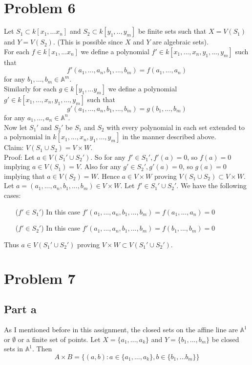 \documentclass[12pt]{article}
\begin{document}
\section*{Problem 6}
Let $S_1 \subset k[x_1,...x_n]$ and $S_2 \subset k[y_1,..,y_m]$ be finite sets such that $X=V(S_1)$ and $Y=V(S_2)$. (This is possible since $X$ and $Y$ are algebraic sets). \\
For each $f \in k[x_1,...x_n]$ we define a polynomial
$f' \in k[x_1,...,x_n,y_1,...,y_m]$ such that
$$f'(a_1,...,a_n,b_1,...,b_m)=f(a_1,...,a_n)$$ for any 
$b_1,...,b_m \in \mathbb{A}^m$. \\
Similarly 
for each $g \in k[y_1,...y_m]$ we define a polynomial
$g' \in k[x_1,...,x_n,y_1,...,y_m]$ such that
$$g'(a_1,...,a_n,b_1,...,b_m)=g(b_1,...,b_m)$$ for any 
$a_1,...,a_n \in \mathbb{A}^n$. \\
Now let $S_1'$ and $S_2'$ be $S_1$ and $S_2$ with every polynomial in each set extended to a polynomial in $k[x_1,...,x_n,y_1,...,y_m]$ in the manner described above. \\
Claim: $V(S_1 \cup S_2)=V \times W$. \\
Proof: Let $a \in V(S_1' \cup S_2')$. So for any $f' \in S_1', f'(a)=0$, so $f(a)=0$ implying $a \in V(S_1)=V$.
Also for any $g' \in S_2', g'(a)=0$, so $g(a)=0$ implying that $a \in V(S_2)=W$. Hence $a \in V \times W$ proving
$V(S_1 \cup S_2) \subset V \times W$. \\
Let $a=(a_1,...,a_n,b_1,...,b_m) \in V \times W$. Let
$f' \in S_1' \cup S_2'$. We have the following cases:
\begin{enumerate}
\item[($f' \in S_1'$)] 
In this case $f'(a_1,...,a_n,b_1,...,b_m)=f(a_1,...,a_n)=0$
\item[($f' \in S_2'$)] 
In this case $f'(a_1,...,a_n,b_1,...,b_m)=f(b_1,...,b_m)=0$
\end{enumerate}
Thus $a \in V(S_1' \cup S_2')$ proving $
V \times W \subset V(S_1' \cup S_2')$.
 
\clearpage 
\section*{Problem 7}
\subsection*{Part a}
As I mentioned before in this assignment, the closed sets on the affine line are $\mathbb{A}^1$ or $\emptyset$ or a finite set of points. Let $X=\{a_1,...,a_k\}$ and $Y=\{b_1,...,b_m\}$ be closed sets in $\mathbb{A}^1$. 
Then 
$$A \times B = \{(a,b): a \in \{a_1,...,a_k\}, b \in \{b_1,...b_m\} \}$$ 
\end{document}
